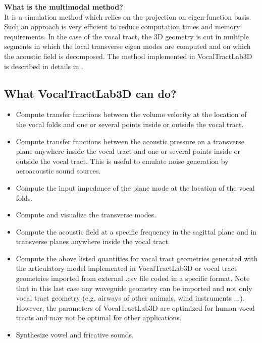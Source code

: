 \documentclass[]{article}
\begin{document}
	\textbf{What is the multimodal method?}\\
	It is a simulation method which relies on the projection on eigen-function basis. 
	Such an approach is very efficient to reduce computation times and memory requirements.
	In the case of the vocal tract, the 3D geometry is cut in multiple segments in which 
	the local transverse eigen modes are computed and on which the acoustic field is decomposed.
	The method implemented in VocalTractLab3D 
	is described in details in \textcite{blandin2022efficient}.
	
	
	\subsection{What VocalTractLab3D can do?}
	
	\begin{itemize}
		\item Compute transfer functions between the volume velocity
		at the location of the vocal folds and one or several points inside or outside the vocal tract.
		\item Compute transfer functions between the acoustic pressure on a transverse plane anywhere inside the vocal tract and one or several points inside or outside the vocal tract.
		This is useful to emulate noise generation by aeroacoustic 
		sound sources.
		\item Compute the input impedance of the plane mode at the 
		location of the vocal folds.
		\item Compute and visualize the transverse modes.
		\item Compute the acoustic field at a specific frequency in the sagittal plane and in transverse planes anywhere inside the vocal tract.
		\item Compute the above listed quantities for vocal tract 
		geometries generated with the articulatory model implemented 
		in VocalTractLab3D or vocal tract geometries imported from 
		external .csv file coded in a specific format. Note that in 
		this last case any waveguide geometry can be imported and not only vocal tract geometry (e.g. airways of other animals, wind instruments ...). However, the parameters of VocalTractLab3D 
		are optimized for human vocal tracts and may not be optimal for
		other applications.
		\item Synthesize vowel and fricative sounds.
	\end{itemize}
\end{document}
